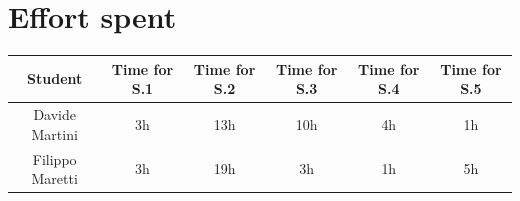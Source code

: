 \section{Effort spent}
\begin{tabular}{ | c || c | c | c | c| c|}
    \hline
    Student             & Time for S.1 & Time for S.2 & Time for S.3 & Time for S.4 & Time for S.5\\ \hline
    Davide Martini  & 3h           & 13h  & 10h          & 4h           & 1h\\ \hline
    Filippo Maretti   &  3h         & 19h  &   3h      &   1h         & 5h\\ 
    \hline
\end{tabular}